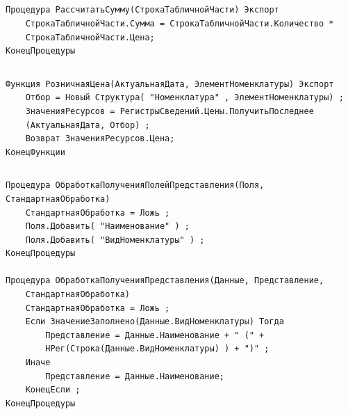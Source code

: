 \documentclass[12pt,a4paper]{article}
\begin{document}
\begin{appendices}

\section{}

\begin{verbatim}
Процедура РассчитатьСумму(СтрокаТабличнойЧасти) Экспорт
    СтрокаТабличнойЧасти.Сумма = СтрокаТабличнойЧасти.Количество *
    СтрокаТабличнойЧасти.Цена;
КонецПроцедуры
\end{verbatim}

\begin{lstlisting}[caption=Процедура РассчитатьСумму из общего модуля РаботаСДокументами]
\end{lstlisting}

\begin{verbatim}
Функция РозничнаяЦена(АктуальнаяДата, ЭлементНоменклатуры) Экспорт
    Отбор = Новый Структура( "Номенклатура" , ЭлементНоменклатуры) ;
    ЗначенияРесурсов = РегистрыСведений.Цены.ПолучитьПоследнее
    (АктуальнаяДата, Отбор) ;
    Возврат ЗначенияРесурсов.Цена;
КонецФункции
\end{verbatim}

\begin{lstlisting}[caption=Функция РозничнаяЦена из общего модуля РаботаСоСправочниками]
\end{lstlisting}

\begin{verbatim}
Процедура ОбработкаПолученияПолейПредставления(Поля, СтандартнаяОбработка)
    СтандартнаяОбработка = Ложь ;
    Поля.Добавить( "Наименование" ) ;
    Поля.Добавить( "ВидНоменклатуры" ) ;
КонецПроцедуры

Процедура ОбработкаПолученияПредставления(Данные, Представление,
    СтандартнаяОбработка)
    СтандартнаяОбработка = Ложь ;
    Если ЗначениеЗаполнено(Данные.ВидНоменклатуры) Тогда
        Представление = Данные.Наименование + " (" +
        НРег(Строка(Данные.ВидНоменклатуры) ) + ")" ;
    Иначе
        Представление = Данные.Наименование;
    КонецЕсли ;
КонецПроцедуры
\end{verbatim}

\begin{lstlisting}[caption=Процедуры в модуле менеджера справочника Номенклатура]
\end{lstlisting}

\newpage


\end{appendices}
\end{document}
